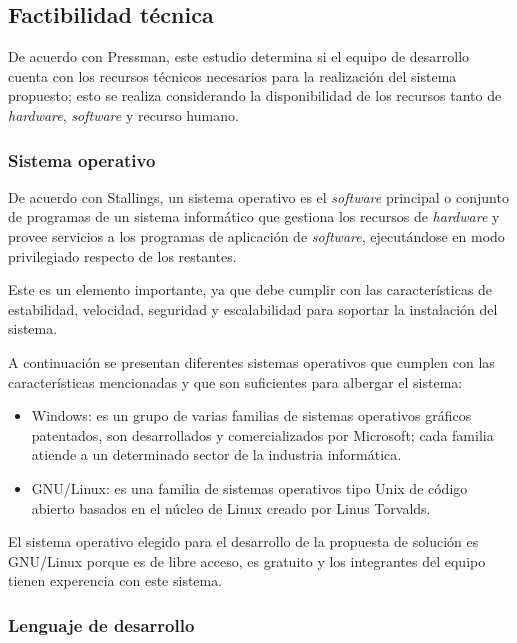 \subsection{Factibilidad técnica}\label{ref:factibilidad-tecnica}

De acuerdo con Pressman\cite{pressman_software_2005}, este estudio determina si el equipo de desarrollo cuenta con los recursos técnicos necesarios para la realización del sistema propuesto; esto se realiza considerando la disponibilidad de los recursos tanto de \textit{hardware}, \textit{software} y recurso humano.

\subsubsection*{Sistema operativo}

De acuerdo con Stallings\cite{stallings_operating_2012}, un sistema operativo es el \textit{software} principal o conjunto de programas de un sistema informático que gestiona los recursos de \textit{hardware} y provee servicios a los programas de aplicación de \textit{software}, ejecutándose en modo privilegiado respecto de los restantes.


Este es un elemento importante, ya que debe cumplir con las características de estabilidad, velocidad, seguridad y escalabilidad para soportar la instalación del sistema.


A continuación se presentan diferentes sistemas operativos que cumplen con las características mencionadas y que son suficientes para albergar el sistema:

\begin{itemize}
    \item Windows: es un grupo de varias familias de sistemas operativos gráficos patentados, son desarrollados y comercializados por Microsoft; cada familia atiende a un determinado sector de la industria informática\cite{wilson_about_2015}.
    \item GNU/Linux: es una familia de sistemas operativos tipo Unix de código abierto basados en el núcleo de Linux creado por Linus Torvalds\cite{love_linux_2010}.
\end{itemize}

El sistema operativo elegido para el desarrollo de la propuesta de solución es GNU/Linux porque es de libre acceso, es gratuito y los integrantes del equipo tienen experencia con este sistema.


\subsubsection*{Lenguaje de desarrollo}

